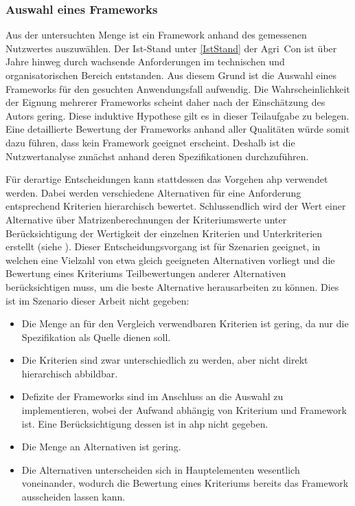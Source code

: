 \subsubsection{Auswahl eines Frameworks}
Aus der untersuchten Menge ist ein Framework anhand des gemessenen Nutzwertes auszuwählen.
Der Ist-Stand unter \ref{IstStand} der Agri~Con ist über Jahre hinweg durch wachsende  Anforderungen im technischen und organisatorischen Bereich entstanden.
Aus diesem Grund ist die Auswahl eines Frameworks für den gesuchten Anwendungsfall aufwendig.
Die Wahrscheinlichkeit der Eignung mehrerer Frameworks scheint daher nach der Einschätzung des Autors gering.
Diese induktive Hypothese gilt es in dieser Teilaufgabe zu belegen.
Eine detaillierte Bewertung der Frameworks anhand aller Qualitäten würde somit dazu führen, dass kein Framework geeignet erscheint.
Deshalb ist die Nutzwertanalyse zunächst anhand deren Spezifikationen durchzuführen.

Für derartige Entscheidungen kann stattdessen das Vorgehen \Gls{ahp} verwendet werden.
Dabei werden verschiedene Alternativen für eine Anforderung entsprechend Kriterien hierarchisch bewertet.
Schlussendlich wird der Wert einer Alternative über Matrizenberechnungen der Kriteriumswerte unter Berücksichtigung der Wertigkeit der einzelnen Kriterien und Unterkriterien erstellt (siehe \cite{website:ahp-gaul}).
Dieser Entscheidungsvorgang ist für Szenarien geeignet, in welchen eine Vielzahl von etwa gleich geeigneten Alternativen vorliegt und die Bewertung eines Kriteriums Teilbewertungen anderer Alternativen berücksichtigen muss, um die beste Alternative herausarbeiten zu können.
Dies ist im Szenario dieser Arbeit nicht gegeben:
\begin{itemize}
\item Die Menge an für den Vergleich verwendbaren Kriterien ist gering, da nur die Spezifikation als Quelle dienen soll.
\item Die Kriterien sind zwar unterschiedlich zu werden, aber nicht direkt hierarchisch abbildbar.
\item Defizite der Frameworks sind im Anschluss an die Auswahl  zu implementieren, wobei der Aufwand abhängig von Kriterium und Framework ist. Eine Berücksichtigung dessen ist in \Gls{ahp} nicht gegeben.
\item Die Menge an Alternativen ist gering.
\item Die Alternativen unterscheiden sich in Hauptelementen wesentlich voneinander, wodurch die Bewertung eines Kriteriums bereits das Framework ausscheiden lassen kann.
\end{itemize}

